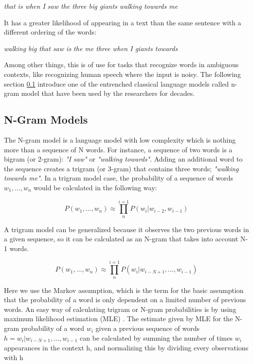 \begin{displayquote}
\emph{that is when I saw the three big giants walking towards me}
\end{displayquote}

It has a greater likelihood of appearing in a text than the same sentence with a different ordering of the words:

\begin{displayquote}
\emph{walking big that saw is the me three when I giants towards}
\end{displayquote}

Among other things, this is of use for tasks that recognize words in ambiguous contexts, like recognizing human speech where the input is noisy. The following section \ref{sec:n-gram} introduce one of the entrenched classical language models called n-gram model that have been used by the researchers for decades.

\subsection{N-Gram Models}
\label{sec:n-gram}

The N-gram model is a language model with low complexity which is nothing more than a sequence of N words. For instance, a sequence of two words is a bigram (or 2-gram): \emph{"I saw"} or \emph{"walking towards"}. Adding an additional word to the sequence creates a trigram (or 3-gram) that contains three words; \emph{"walking towards me"}. In a trigram model case, the probability of a sequence of words $w_1,...,w_{n}$ would be calculated in the following way:

\begin{equation}
    P(w_1,...,w_n) \approx \prod_{n}^{i=1} P(w_i|w_{i-2},w_{i-1})
\end{equation}

A trigram model can be generalized because it observes the two previous words in a given sequence, so it can be calculated as an N-gram that takes into account N-1 words.

\begin{equation}
    P(w_1,...,w_n) \approx \prod_{n}^{i=1} P(w_i|w_{i-N+1},...,w_{i-1})
\end{equation}

Here we use the Markov assumption, which is the term for the basic assumption that the probability of a word is only dependent on a limited number of previous words. An easy way of calculating trigram or N-gram probabilities is by using maximum likelihood estimation (MLE) \parencite{jurafsky2014speech}. The estimate given by MLE for the N-gram probability of a word $w_i$ given a previous sequence of words $h = w_i|w_{i-N+1},...,w_{i-1}$ can be calculated by summing the number of times $w_i$ appearances in the context h, and normalizing this by dividing every observations with h \parencite{goodman2001bit,mikolov2012statistical}

